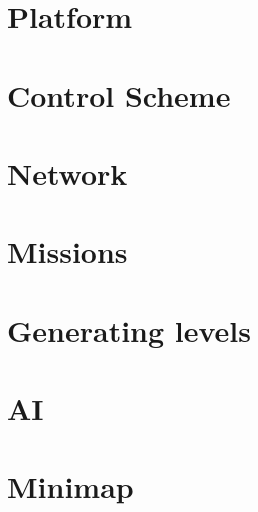 \chapter{Platform}


\chapter{Control Scheme}


\chapter{Network}


\chapter{Missions}


\chapter{Generating levels}


\chapter{AI}


\chapter{Minimap}

